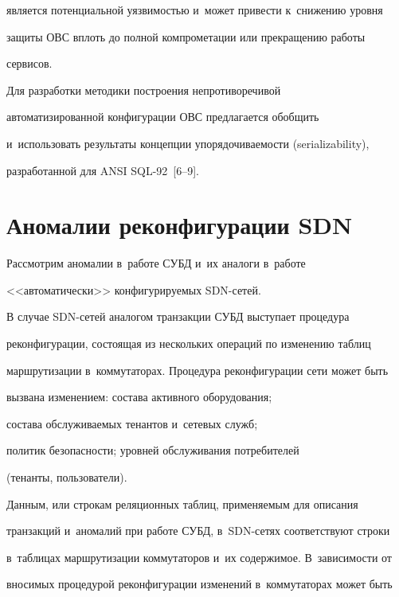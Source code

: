 является потенциальной уязвимостью и~может привести к~снижению уровня 


защиты ОВС вплоть до полной компрометации или прекращению работы 


сервисов. 


   


   Для разработки методики построения непротиворечивой 


автоматизированной конфигурации ОВС предлагается обобщить 


и~использовать результаты концепции упорядочиваемости (serializability), 


разработанной для ANSI SQL-92~[6--9].


   


\section{Аномалии реконфигурации SDN}





   Рассмотрим аномалии в~работе СУБД и~их аналоги в~работе 


<<автоматически>> конфигурируемых SDN-сетей.


   


     В случае SDN-сетей аналогом транзакции СУБД выступает процедура 


реконфигурации, состоящая из нескольких операций по изменению таблиц 


маршрутизации в~коммутаторах. Процедура реконфигурации сети может быть 


вызвана изменением: состава активного оборудования; 


состава обслуживаемых тенантов и~сетевых служб; 


политик безопасности; уровней обслуживания потребителей 


(тенанты, пользователи). 


     


     Данным, или строкам реляционных таблиц, применяемым для описания 


транзакций и~аномалий при работе СУБД, в~SDN-се\-тях соответствуют строки 


в~таблицах маршрутизации коммутаторов и~их содержимое. В~зависимости от 


вносимых процедурой реконфигурации изменений в~коммутаторах может быть 


